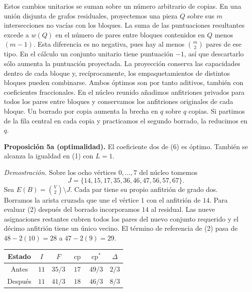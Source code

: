 \documentclass[spanish,11pt,a4paper]{article}
\begin{document}
Estos cambios unitarios se suman sobre un número arbitrario de copias. En una unión disjunta de grafos residuales, proyectemos una pieza \(Q\) sobre sus \(m\) intersecciones no vacías con los bloques. La suma de las puntuaciones resultantes excede a \(w(Q)\) en el número de pares entre bloques contenidos en \(Q\) menos \((m-1)\). Esta diferencia es no negativa, pues hay al menos \(\binom m2\) pares de ese tipo. En el cálculo un conjunto unitario tiene puntuación \(-1\), así que descartarlo sólo aumenta la puntuación proyectada. La proyección conserva las capacidades dentro de cada bloque y, recíprocamente, los empaquetamientos de distintos bloques pueden combinarse. Ambos óptimos son por tanto aditivos, también con coeficientes fraccionales. En el núcleo reunido añadimos anfitriones privados para todos los pares entre bloques y conservamos los anfitriones originales de cada bloque. Un borrado por copia aumenta la brecha en \(q\) sobre \(q\) copias. Si partimos de la fila central en cada copia y practicamos el segundo borrado, la reducimos en \(q\).

\textbf{Proposición 5a (optimalidad).} El coeficiente dos de (6) es óptimo. También se alcanza la igualdad en (1) con \(L=1\).

\emph{Demostración.} Sobre los ocho vértices \(0,\ldots,7\) del núcleo tomemos \[
J=\{14,15,17,35,36,46,47,56,57,67\}.
\] Sea \(E(B)=\binom{V}{2}\setminus J\). Cada par tiene su propio anfitrión de grado dos. Borramos la arista cruzada que une el vértice \(1\) con el anfitrión de \(14\). Para evaluar (2) después del borrado incorporamos \(14\) al residual. Las nueve asignaciones restantes cubren todos los pares del nuevo conjunto requerido y el décimo anfitrión tiene un único vecino. El término de referencia de (2) pasa de \(48-2(10)=28\) a \(47-2(9)=29\).

\begin{center}
\begin{tabular}{cccccc}
\toprule
Estado & $I$ & $F$ & $\operatorname{cp}$ & $\operatorname{cp}^{\ast}$ & $\Delta$ \\
\midrule
Antes & $11$ & $35/3$ & $17$ & $49/3$ & $2/3$ \\
Después & $11$ & $41/3$ & $18$ & $46/3$ & $8/3$ \\
\bottomrule
\end{tabular}
\end{center}
\end{document}
